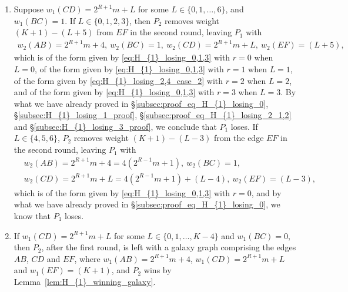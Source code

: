\documentclass[11pt,reqno]{amsart}
\theoremstyle{definition}
\theoremstyle{definition}
\begin{document}
\begin{enumerate}
\begin{enumerate}
\begin{align}
w_{2}(AB)=2^{R+1}m+1,\ w_{2}(CD)=2^{R+1}m+(8n+3),\ w_{2}(EF)=(8n+2)\nonumber
\end{align}
when $K=(8n+1)$ for some $n \in \mathbb{N}$. In each case, the triple is balanced, and $P_{1}$ loses by Theorem~\ref{thm:galaxy}. Likewise, when $K \equiv 0 \bmod 8$, $w_{1}(CD)=2^{R+1}m+(K+3)$ and $w_{1}(BC)=1$, $P_{2}$ removes $BC$ and weight $2$ from $AB$ in the second round, leaving $P_{1}$ with a galaxy graph consisting of the edges $AB$, $CD$ and $EF$, where (once again, writing $K=8n$ for some $n \in \mathbb{N}$)
\begin{equation}
w_{2}(AB)=2^{R+1}m+2,\ w_{2}(CD)=2^{R+1}m+(8n+3),\ w_{2}(EF)=(8n+1),\nonumber
\end{equation}
and as this triple is balanced, $P_{1}$ loses by Theorem~\ref{thm:galaxy}.

\item Suppose $w_{1}(CD)=2^{R+1}m+L$ for some $L \in \{0,1,\ldots,6\}$, and $w_{1}(BC)=1$. If $L \in \{0,1,2,3\}$, then $P_{2}$ removes weight $(K+1)-(L+5)$ from $EF$ in the second round, leaving $P_{1}$ with
\begin{align}
w_{2}(AB)=2^{R+1}m+4,\ w_{2}(BC)=1,\ w_{2}(CD)=2^{R+1}m+L,\ w_{2}(EF)=(L+5),\nonumber
\end{align}
which is of the form given by \eqref{eq:H_{1}_losing_0,1,3} with $r=0$ when $L=0$, of the form given by \eqref{eq:H_{1}_losing_0,1,3} with $r=1$ when $L=1$, of the form given by \eqref{eq:H_{1}_losing_2,4_case_2} with $r=2$ when $L=2$, and of the form given by \eqref{eq:H_{1}_losing_0,1,3} with $r=3$ when $L=3$. By what we have already proved in \S\ref{subsec:proof_eq_H_{1}_losing_0}, \S\ref{subsec:H_{1}_losing_1_proof}, \S\ref{subsec:proof_eq_H_{1}_losing_2_1,2} and \S\ref{subsec:H_{1}_losing_3_proof}, we conclude that $P_{1}$ loses. If $L \in \{4,5,6\}$, $P_{2}$ removes weight $(K+1)-(L-3)$ from the edge $EF$ in the second round, leaving $P_{1}$ with
\begin{align}
{}&w_{2}(AB)=2^{R+1}m+4=4\left(2^{R-1}m+1\right),\ w_{2}(BC)=1,\nonumber\\
{}&w_{2}(CD)=2^{R+1}m+L=4\left(2^{R-1}m+1\right)+(L-4),\ w_{2}(EF)=(L-3),\nonumber
\end{align}
which is of the form given by \eqref{eq:H_{1}_losing_0,1,3} with $r=0$, and by what we have already proved in \S\ref{subsec:proof_eq_H_{1}_losing_0}, we know that $P_{1}$ loses.

\item If $w_{1}(CD)=2^{R+1}m+L$ for some $L \in \{0,1,\ldots,K-4\}$ and $w_{1}(BC)=0$, then $P_{2}$, after the first round, is left with a galaxy graph comprising the edges $AB$, $CD$ and $EF$, where $w_{1}(AB)=2^{R+1}m+4$, $w_{1}(CD)=2^{R+1}m+L$ and $w_{1}(EF)=(K+1)$, and $P_{2}$ wins by Lemma~\ref{lem:H_{1}_winning_galaxy}. 


\end{enumerate}
\end{enumerate}
\end{document}
